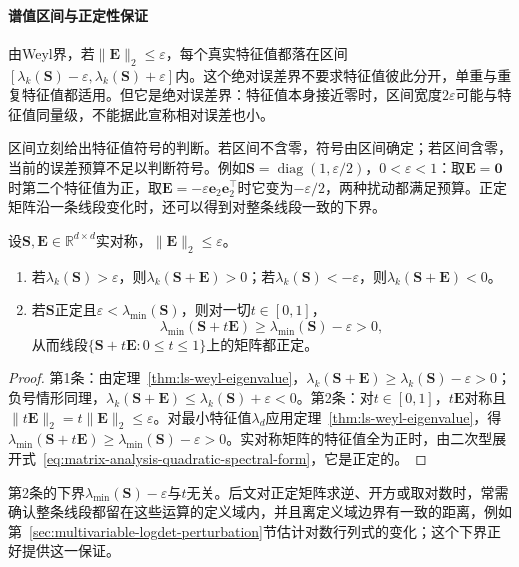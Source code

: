 \paragraph{谱值区间与正定性保证}

由Weyl界，若$\lVert\bm E\rVert_2\leq\varepsilon$，每个真实特征值都落在区间$[\lambda_k(\bm S)-\varepsilon,\lambda_k(\bm S)+\varepsilon]$内。这个绝对误差界不要求特征值彼此分开，单重与重复特征值都适用。但它是绝对误差界：特征值本身接近零时，区间宽度$2\varepsilon$可能与特征值同量级，不能据此宣称相对误差也小。

区间立刻给出特征值符号的判断。若区间不含零，符号由区间确定；若区间含零，当前的误差预算不足以判断符号。例如$\bm S=\operatorname{diag}(1,\varepsilon/2)$，$0<\varepsilon<1$：取$\bm E=\bm0$时第二个特征值为正，取$\bm E=-\varepsilon\bm e_2\bm e_2^\top$时它变为$-\varepsilon/2$，两种扰动都满足预算。正定矩阵沿一条线段变化时，还可以得到对整条线段一致的下界。
\begin{theorem}[特征值的符号与正定性保持]
\label{thm:ls-eigenvalue-sign-definiteness}
设$\bm S,\bm E\in\mathbb R^{d\times d}$实对称，$\lVert\bm E\rVert_2\leq\varepsilon$。
\begin{enumerate}
 \item 若$\lambda_k(\bm S)>\varepsilon$，则$\lambda_k(\bm S+\bm E)>0$；若$\lambda_k(\bm S)<-\varepsilon$，则$\lambda_k(\bm S+\bm E)<0$。
 \item 若$\bm S$正定且$\varepsilon<\lambda_{\min}(\bm S)$，则对一切$t\in[0,1]$，
 \[
  \lambda_{\min}(\bm S+t\bm E)\geq\lambda_{\min}(\bm S)-\varepsilon>0 ,
 \]
 从而线段$\{\bm S+t\bm E:0\leq t\leq1\}$上的矩阵都正定。
\end{enumerate}
\end{theorem}
\begin{proof}
第1条：由定理~\ref{thm:ls-weyl-eigenvalue}，$\lambda_k(\bm S+\bm E)\geq\lambda_k(\bm S)-\varepsilon>0$；负号情形同理，$\lambda_k(\bm S+\bm E)\leq\lambda_k(\bm S)+\varepsilon<0$。第2条：对$t\in[0,1]$，$t\bm E$对称且$\lVert t\bm E\rVert_2=t\lVert\bm E\rVert_2\leq\varepsilon$。对最小特征值$\lambda_d$应用定理~\ref{thm:ls-weyl-eigenvalue}，得$\lambda_{\min}(\bm S+t\bm E)\geq\lambda_{\min}(\bm S)-\varepsilon>0$。实对称矩阵的特征值全为正时，由二次型展开式~\eqref{eq:matrix-analysis-quadratic-spectral-form}，它是正定的。
\end{proof}
第2条的下界$\lambda_{\min}(\bm S)-\varepsilon$与$t$无关。后文对正定矩阵求逆、开方或取对数时，常需确认整条线段都留在这些运算的定义域内，并且离定义域边界有一致的距离，例如第~\ref{sec:multivariable-logdet-perturbation}节估计对数行列式的变化；这个下界正好提供这一保证。


